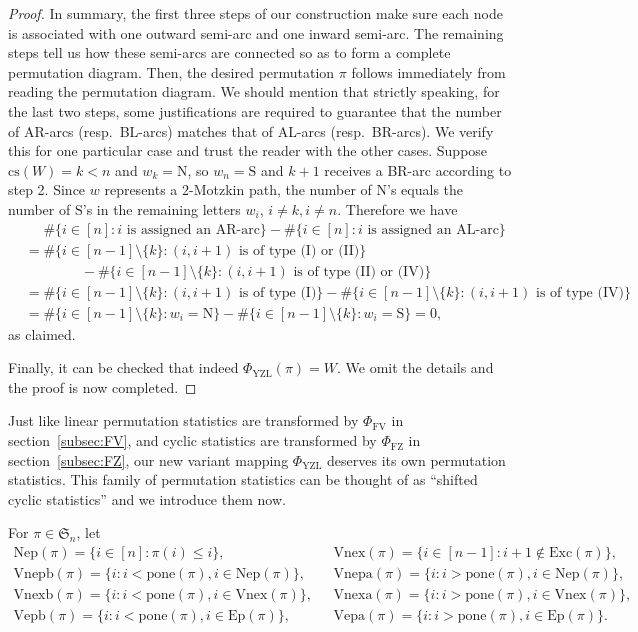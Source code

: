 \documentclass[12pt]{amsart}
\numberwithin{equation}{section}
\theoremstyle{plain}
\theoremstyle{definition}
\def\FV{\mathrm{FV}}
\def\FZ{\mathrm{FZ}}
\def\YZL{\mathrm{YZL}}
\def\SS{\mathfrak{S}}
\def\N{\mathrm{N}}
\def\S{\mathrm{S}}
\def\cs{\mathrm{cs}}
\def\Excp{\mathrm{Ep}}
\def\Exc{\mathrm{Exc}}
\def\Nexcp{\mathrm{Nep}}
\def\Vnexpb{\mathrm{Vnepb}}
\def\Vnexpa{\mathrm{Vnepa}}
\def\Vnexb{\mathrm{Vnexb}}
\def\Vnexa{\mathrm{Vnexa}}
\def\Vexpb{\mathrm{Vepb}}
\def\Vexpa{\mathrm{Vepa}}
\def\Vnex{\mathrm{Vnex}}
\def\pone{\mathrm{pone}}
\begin{document}
\begin{proof}
In summary, the first three steps of our construction make sure each node is associated with one outward semi-arc and one inward semi-arc. The remaining steps tell us how these semi-arcs are connected so as to form a complete permutation diagram. Then, the desired permutation $\pi$ follows immediately from reading the permutation diagram. We should mention that strictly speaking, for the last two steps, some justifications are required to guarantee that the number of AR-arcs (resp.~BL-arcs) matches that of AL-arcs (resp.~BR-arcs). We verify this for one particular case and trust the reader with the other cases. Suppose $\cs(W)=k<n$ and $w_k=\N$, so $w_n=\S$ and $k+1$ receives a BR-arc according to step 2. Since $w$ represents a $2$-Motzkin path, the number of $\N$'s equals the number of $\S$'s in the remaining letters $w_i$, $i\neq k,i\neq n$. Therefore we have
\begin{align*}
&\phantom{=} \#\{i\in [n]: \text{$i$ is assigned an AR-arc}\}-\#\{i\in [n]: \text{$i$ is assigned an AL-arc}\}\\
&=\#\{i\in[n-1]\setminus\{k\}:\text{$(i,i+1)$ is of type (I) or (II)}\}\\
&\qquad\qquad -\#\{i\in[n-1]\setminus\{k\}:\text{$(i,i+1)$ is of type (II) or (IV)}\}\\
&=\#\{i\in[n-1]\setminus\{k\}:\text{$(i,i+1)$ is of type (I)}\}-\#\{i\in[n-1]\setminus\{k\}:\text{$(i,i+1)$ is of type (IV)}\}\\
&=\#\{i\in[n-1]\setminus\{k\}:w_i=\N\}-\#\{i\in[n-1]\setminus\{k\}:w_i=\S\}=0,
\end{align*}
as claimed.

Finally, it can be checked that indeed $\Phi_{\YZL}(\pi)=W$. We omit the details and the proof is now completed.
\end{proof}

Just like linear permutation statistics are transformed by $\Phi_{\FV}$ in section~\ref{subsec:FV}, and cyclic statistics are transformed by $\Phi_{\FZ}$ in section~\ref{subsec:FZ}, our new variant mapping $\Phi_{\YZL}$ deserves its own permutation statistics. This family of permutation statistics can be thought of as ``shifted cyclic statistics'' and we introduce them now.

For $\pi \in \SS_n$,  let
\begin{align*}
  \Nexcp(\pi)=\{i \in [n] : \pi(i) \leq i\}, &\,\,\,\, \Vnex(\pi)=\{ i \in [n-1]: i+1 \notin \Exc(\pi)\},\\[3pt]
  \Vnexpb(\pi)=\{i : i <\pone(\pi), i \in \Nexcp(\pi)\}, &\,\,\,\,
  \Vnexpa(\pi)=\{i : i >\pone(\pi), i \in \Nexcp(\pi)\}, \\[3pt]
  \Vnexb(\pi)=\{i : i <\pone(\pi), i \in \Vnex(\pi)\}, & \,\,\,\,\Vnexa(\pi)=\{i : i >\pone(\pi), i \in \Vnex(\pi)\}, \\[3pt]
  \Vexpb(\pi)=\{i : i <\pone(\pi), i \in \Excp(\pi)\}, &\,\,\,\, \Vexpa(\pi)=\{i : i >\pone(\pi), i \in \Excp(\pi)\}.
\end{align*}
\end{document}

